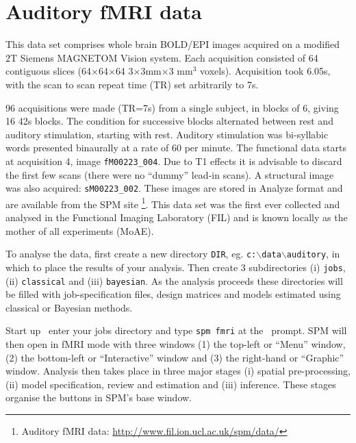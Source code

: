 \chapter{Auditory fMRI data \label{Chap:data:auditory}}
 
This data set comprises whole brain BOLD/EPI images acquired on a modified 2T Siemens MAGNETOM Vision system. Each acquisition consisted of 64 contiguous slices (64$\times$64$\times$64 3$\times$3mm$\times$3 mm$^3$ voxels). Acquisition took 6.05s, with the scan to scan repeat time (TR) set arbitrarily to 7s.

96 acquisitions were made (TR=7s) from a single subject, in blocks of 6, giving 16 42s blocks. The condition for successive blocks alternated between rest and auditory stimulation, starting with rest. Auditory stimulation was bi-syllabic words presented binaurally at a rate of 60 per minute. The functional data starts at acquisition 4, image \texttt{fM00223\_004}. Due to T1 effects it is advisable to discard the first few scans (there were no ``dummy'' lead-in scans). A structural image was also acquired: \texttt{sM00223\_002}. These images are stored in Analyze format and are available from the SPM site \footnote{Auditory fMRI data: \url{http://www.fil.ion.ucl.ac.uk/spm/data/}}. This data set was the first ever collected and analysed in the Functional Imaging Laboratory (FIL) and is known locally as the mother of all experiments (MoAE).

To analyse the data, first create a new directory \texttt{DIR},  eg. \texttt{c:$\backslash$data$\backslash$auditory}, in which to place the results of your analysis. Then create 3 subdirectories (i) \texttt{jobs}, (ii) \texttt{classical} and (iii) \texttt{bayesian}. As the analysis proceeds these directories will be filled with job-specification files, design matrices and models estimated using classical or Bayesian methods.

Start up \matlab\, enter your jobs directory and type \texttt{spm fmri} at the \matlab\ prompt. SPM will then open in fMRI mode with three windows (1) the top-left or ``Menu'' window, (2) the bottom-left or ``Interactive'' window and (3) the right-hand or ``Graphic'' window. Analysis then takes place in three major stages (i) spatial pre-processing, (ii) model specification, review and estimation and (iii) inference. These stages organise the buttons in SPM's base window.

